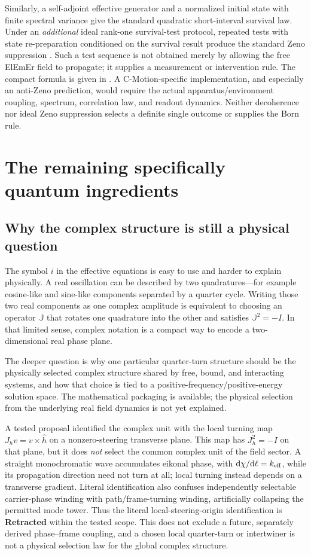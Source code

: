 \documentclass[11pt]{article}
\theoremstyle{definition}
\newcommand{\ElEmEr}{\mbox{ElEmEr}}
\newcommand{\dd}{\mathrm{d}}
\newcommand{\statusRetracted}{\textcolor{red!80!black}{\textbf{Retracted}}}
\begin{document}
Similarly, a self-adjoint effective generator and a normalized initial state with finite
spectral variance give the standard quadratic short-interval survival law.  Under an
\emph{additional} ideal rank-one survival-test protocol, repeated tests with
state re-preparation conditioned on the survival result produce the standard Zeno
suppression \cite{MisraSudarshan1977}.  Such a test sequence is not obtained merely
by allowing the free \ElEmEr{} field to propagate; it supplies a measurement or
intervention rule.  The compact formula is given in .
A C-Motion-specific implementation, and especially an anti-Zeno prediction, would
require the actual apparatus/environment coupling, spectrum, correlation law, and
readout dynamics.  Neither decoherence nor ideal Zeno suppression selects a
definite single outcome or supplies the Born rule.

\section{The remaining specifically quantum ingredients}
\label{sec:complexmeasurement}

\subsection{Why the complex structure is still a physical question}

The symbol $i$ in the effective equations is easy to use and harder to explain physically.  A
real oscillation can be described by two quadratures---for example cosine-like and sine-like
components separated by a quarter cycle.  Writing those two real components as one complex
amplitude is equivalent to choosing an operator $\mathbb J$ that rotates one quadrature into
the other and satisfies $\mathbb J^2=-I$.  In that limited sense, complex notation is a compact
way to encode a two-dimensional real phase plane.

The deeper question is why one particular quarter-turn structure should be the physically
selected complex structure shared by free, bound, and interacting systems, and how that choice
is tied to a positive-frequency/positive-energy solution space.  The mathematical packaging is
available; the physical selection from the underlying real field dynamics is not yet explained.

A tested proposal identified the complex unit with the local turning map
$J_h v=v\times\widehat h$ on a nonzero-steering transverse plane.  This map
has $J_h^2=-I$ on that plane, but it does \emph{not} select the common complex
unit of the field sector.  A straight monochromatic wave accumulates eikonal
phase, with $\dd\chi/\dd\ell=k_{\rm eff}$, while its propagation direction
need not turn at all; local turning instead depends on a transverse gradient.
Literal identification also confuses independently selectable carrier-phase
winding with path/frame-turning winding, artificially collapsing the permitted
mode tower.  Thus the literal local-steering-origin identification is
\statusRetracted{} within the tested scope.  This does not exclude a future, separately derived
phase--frame coupling, and a chosen local quarter-turn or intertwiner is not a
physical selection law for the global complex structure.
\end{document}
